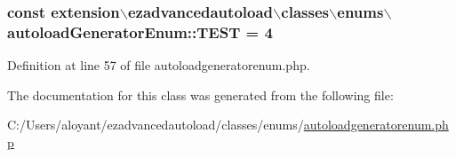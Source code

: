 \hypertarget{classextension_1_1ezadvancedautoload_1_1classes_1_1enums_1_1autoload_generator_enum_a7c160c4cf91bf4721a2ea9af96f4624a}{
\subsubsection[{T\-E\-S\-T}]{\setlength{\rightskip}{0pt plus 5cm}const {\bf extension$\backslash$ezadvancedautoload$\backslash$classes$\backslash$enums$\backslash$autoload\-Generator\-Enum\-::\-T\-E\-S\-T} = 4}}\label{classextension_1_1ezadvancedautoload_1_1classes_1_1enums_1_1autoload_generator_enum_a7c160c4cf91bf4721a2ea9af96f4624a}


Definition at line 57 of file autoloadgeneratorenum.\-php.



The documentation for this class was generated from the following file\-:\begin{DoxyCompactItemize}
\item 
C\-:/\-Users/aloyant/ezadvancedautoload/classes/enums/\hyperlink{autoloadgeneratorenum_8php}{autoloadgeneratorenum.\-php}\end{DoxyCompactItemize}
